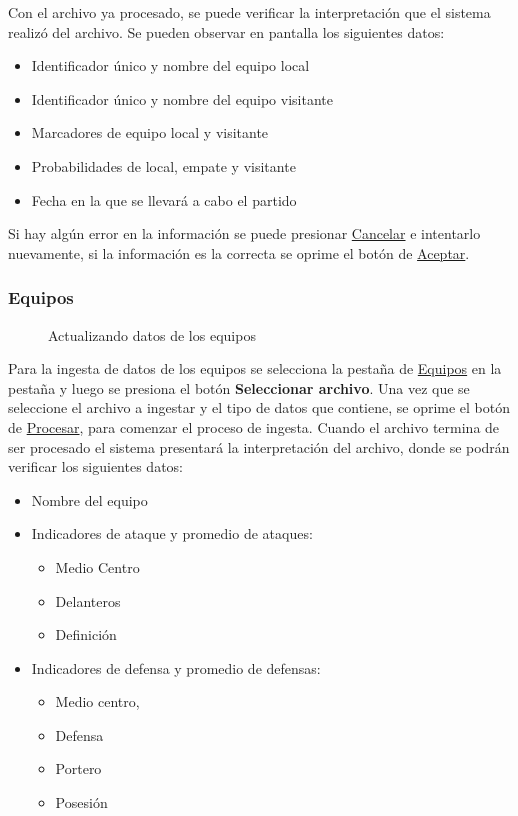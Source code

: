 Con el archivo ya procesado, se puede verificar la interpretación que el sistema realizó del archivo. Se pueden observar en pantalla los siguientes datos:
\begin{itemize}
\item Identificador único y nombre del equipo local
\item Identificador único y nombre del equipo visitante
\item Marcadores de equipo local y visitante
\item Probabilidades de local, empate y visitante
\item Fecha en la que se llevará a cabo el partido
\end{itemize}

Si hay algún error en la información se puede presionar \underline{Cancelar} e intentarlo nuevamente, si la información es la correcta se oprime el botón de \underline{Aceptar}.


\subsubsection{Equipos}
\begin{figure}[!htb]\centering
   \begin {minipage}{1\textwidth}
     \caption{Actualizando datos de los equipos}
	 \label{Fig:equipos}
   \end{minipage}
\end{figure}

Para la ingesta de datos de los equipos se selecciona la pestaña de \underline{Equipos} en la pestaña y luego se presiona el botón \textbf{Seleccionar archivo}.
Una vez que se seleccione el archivo a ingestar y el tipo de datos que contiene, se oprime el botón de \underline{Procesar}, para comenzar el proceso de ingesta.
Cuando el archivo termina de ser procesado el sistema presentará la interpretación del archivo, donde se podrán verificar los siguientes datos:
\begin{itemize}
\item Nombre del equipo
\item Indicadores de ataque y promedio de ataques:
	\begin{itemize}
		\item Medio Centro
		\item Delanteros
		\item Definición
	\end{itemize}
\item Indicadores de defensa y promedio de defensas:
	\begin{itemize}
		\item Medio centro,
		\item Defensa
		\item Portero
		\item Posesión
	\end{itemize}
\end{itemize}

